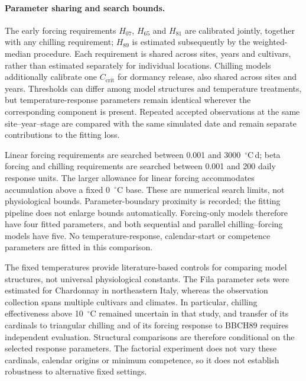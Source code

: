 \documentclass[a4paper,11pt]{article}
\begin{document}
\paragraph{Parameter sharing and search bounds.}
The early forcing requirements $H_{07}$, $H_{65}$ and $H_{81}$ are calibrated jointly, together with any chilling requirement; $H_{89}$ is estimated subsequently by the weighted-median procedure. Each requirement is shared across sites, years and cultivars, rather than estimated separately for individual locations. Chilling models additionally calibrate one $C_{\mathrm{crit}}$ for dormancy release, also shared across sites and years. Thresholds can differ among model structures and temperature treatments, but temperature-response parameters remain identical wherever the corresponding component is present. Repeated accepted observations at the same site--year--stage are compared with the same simulated date and remain separate contributions to the fitting loss.

Linear forcing requirements are searched between 0.001 and 3000~$^{\circ}$C\,d; beta forcing and chilling requirements are searched between 0.001 and 200 daily response units. The larger allowance for linear forcing accommodates accumulation above a fixed 0~$^{\circ}$C base. These are numerical search limits, not physiological bounds. Parameter-boundary proximity is recorded; the fitting pipeline does not enlarge bounds automatically. Forcing-only models therefore have four fitted parameters, and both sequential and parallel chilling--forcing models have five. No temperature-response, calendar-start or competence parameters are fitted in this comparison.

The fixed temperatures provide literature-based controls for comparing model structures, not universal physiological constants. The Fila parameter sets were estimated for Chardonnay in northeastern Italy, whereas the observation collection spans multiple cultivars and climates. In particular, chilling effectiveness above 10~$^{\circ}$C remained uncertain in that study, and transfer of its cardinals to triangular chilling and of its forcing response to BBCH89 requires independent evaluation. Structural comparisons are therefore conditional on the selected response parameters. The factorial experiment does not vary these cardinals, calendar origins or minimum competence, so it does not establish robustness to alternative fixed settings.
\end{document}
